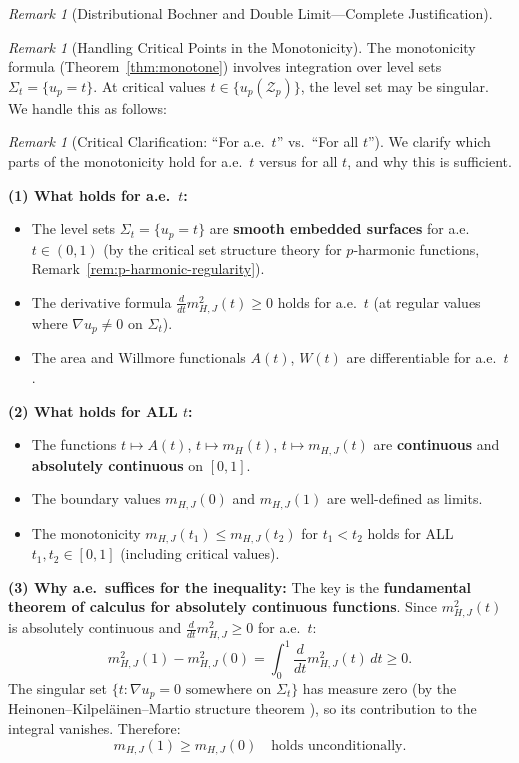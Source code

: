 \documentclass[12pt]{article}
\theoremstyle{plain}
\theoremstyle{definition}
\theoremstyle{remark}
\newtheorem{remark}[theorem]{Remark}
\begin{document}
\begin{remark}[Distributional Bochner and Double Limit---Complete Justification]
\begin{remark}[Handling Critical Points in the Monotonicity]\label{rem:critical-points}
The monotonicity formula (Theorem~\ref{thm:monotone}) involves integration over level sets $\Sigma_t = \{u_p = t\}$. At critical values $t \in \{u_p(\mathcal{Z}_p)\}$, the level set may be singular. We handle this as follows:
\end{remark}

\begin{remark}[Critical Clarification: ``For a.e.\ $t$'' vs.\ ``For all $t$'']\label{rem:ae-vs-all}
We clarify which parts of the monotonicity hold for a.e.\ $t$ versus for all $t$, and why this is sufficient.

\textbf{(1) What holds for a.e.\ $t$:}
\begin{itemize}
    \item The level sets $\Sigma_t = \{u_p = t\}$ are \textbf{smooth embedded surfaces} for a.e.\ $t \in (0,1)$ (by the critical set structure theory for $p$-harmonic functions, Remark~\ref{rem:p-harmonic-regularity}).
    \item The derivative formula $\frac{d}{dt}m_{H,J}^2(t) \geq 0$ holds for a.e.\ $t$ (at regular values where $\nabla u_p \neq 0$ on $\Sigma_t$).
    \item The area and Willmore functionals $A(t)$, $W(t)$ are differentiable for a.e.\ $t$.
\end{itemize}

\textbf{(2) What holds for ALL $t$:}
\begin{itemize}
    \item The functions $t \mapsto A(t)$, $t \mapsto m_H(t)$, $t \mapsto m_{H,J}(t)$ are \textbf{continuous} and \textbf{absolutely continuous} on $[0,1]$.
    \item The boundary values $m_{H,J}(0)$ and $m_{H,J}(1)$ are well-defined as limits.
    \item The monotonicity $m_{H,J}(t_1) \leq m_{H,J}(t_2)$ for $t_1 < t_2$ holds for ALL $t_1, t_2 \in [0,1]$ (including critical values).
\end{itemize}

\textbf{(3) Why a.e.\ suffices for the inequality:}
The key is the \textbf{fundamental theorem of calculus for absolutely continuous functions}. Since $m_{H,J}^2(t)$ is absolutely continuous and $\frac{d}{dt}m_{H,J}^2 \geq 0$ for a.e.\ $t$:
\[
m_{H,J}^2(1) - m_{H,J}^2(0) = \int_0^1 \frac{d}{dt}m_{H,J}^2(t)\, dt \geq 0.
\]
The singular set $\{t : \nabla u_p = 0 \text{ somewhere on } \Sigma_t\}$ has measure zero (by the Heinonen--Kilpel\"ainen--Martio structure theorem \cite{heinonen1993}), so its contribution to the integral vanishes. Therefore:
\[
m_{H,J}(1) \geq m_{H,J}(0) \quad \text{holds unconditionally}.
\]


\end{remark}
\end{remark}
\end{document}
